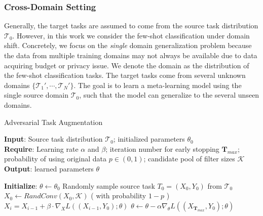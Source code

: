\documentclass{article}
\begin{document}
\subsubsection{Cross-Domain Setting}
Generally, the target tasks are assumed to come from the source task distribution $\mathcal{T}_0$. However, in this work we consider the few-shot classification under domain shift. Concretely, we focus on the \emph{single} domain generalization problem because the data from multiple training domains may not always be available due to data acquiring budget or privacy issue. We denote the domain as the distribution of the few-shot classification tasks. The target tasks come from several unknown domains $\{\mathcal{T}_1',\cdots,\mathcal{T}_N'\}$. The goal is to learn a meta-learning model using the single source domain $\mathcal{T}_0$, such that the model can generalize to the several unseen domains.

\begin{algorithm}[tb]
\caption{Adversarial Task Augmentation}
\label{ATA}
\textbf{Input}: Source task distribution $\mathcal{T}_0$; initialized parameters $\theta_0$ \\
\textbf{Require}: Learning rate $\alpha$ and $\beta$; iteration number for early stopping $\mathbf{T}_{max}$; probability of using original data $p\in(0,1)$; candidate pool of filter sizes $\mathcal{K}$ \\
\textbf{Output}: learned parameters $\theta$
\begin{algorithmic}[1]
\STATE \textbf{Initialize}: $\theta\leftarrow\theta_0$
\STATE Randomly sample source task $T_0=(X_0,Y_0)$ from $\mathcal{T}_0$
\STATE $X_0\leftarrow RandConv(X_0, \mathcal{K})$ ( with probability $1-p$ )
\STATE $X_i=X_{i-1}+\beta\cdot\nabla_XL((X_{i-1},Y_0);\theta)$
\ENDFOR
\STATE $\theta\leftarrow\theta-\alpha\nabla_{\theta}L((X_{\mathbf{T}_{max}},Y_0);\theta)$
\ENDWHILE
\end{algorithmic}
\end{algorithm}
\end{document}
